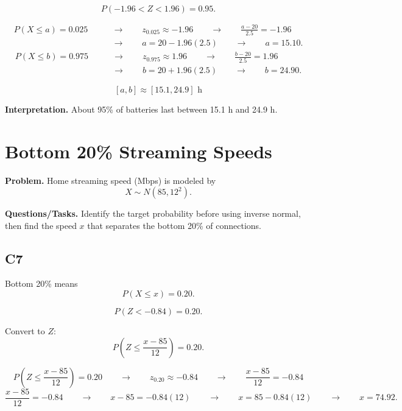 	\[
	P(-1.96<Z<1.96)=0.95.
	\]
	
	
	\[
	\begin{aligned}
	P(X \leq a)=0.025
	&\qquad \longrightarrow \qquad z_{0.025}\approx -1.96
	\qquad \longrightarrow \qquad \frac{a-20}{2.5}=-1.96\\
	&\qquad \longrightarrow \qquad a=20-1.96(2.5)
	\qquad \longrightarrow \qquad a=15.10.
	\end{aligned}
	\]
	\[
	\begin{aligned}
	P(X \leq b)=0.975
	&\qquad \longrightarrow \qquad z_{0.975}\approx 1.96
	\qquad \longrightarrow \qquad \frac{b-20}{2.5}=1.96\\
	&\qquad \longrightarrow \qquad b=20+1.96(2.5)
	\qquad \longrightarrow \qquad b=24.90.
	\end{aligned}
	\]
	
	\[
	[a,b] \approx [15.1, 24.9]\text{ h}
	\]
	
	\textbf{Interpretation.} About 95\% of batteries last between 15.1 h and 24.9 h.
	
	\section{Bottom 20\% Streaming Speeds}
	
	\textbf{Problem.} Home streaming speed (Mbps) is modeled by
	\[
	X \sim N(85, 12^2).
	\]
	
	\textbf{Questions/Tasks.} Identify the target probability before using inverse normal, then find the speed $x$ that separates the bottom 20\% of connections.
	
	\subsection*{C7}
	
	Bottom 20\% means
	\[
	P(X \leq x) = 0.20.
	\]
	
	\[
	P(Z<-0.84)=0.20.
	\]
	
	
	Convert to $Z$:
	\[
	P\left(Z \leq \frac{x - 85}{12}\right) = 0.20.
	\]
	
	\[
	P\left(Z \leq \frac{x - 85}{12}\right)=0.20
	\qquad \longrightarrow \qquad
	z_{0.20}\approx -0.84
	\qquad \longrightarrow \qquad
	\frac{x - 85}{12}=-0.84
	\]
	\[
	\frac{x - 85}{12}=-0.84
	\qquad \longrightarrow \qquad
	x-85=-0.84(12)
	\qquad \longrightarrow \qquad
	x=85-0.84(12)
	\qquad \longrightarrow \qquad
	x=74.92.
	\]
	
